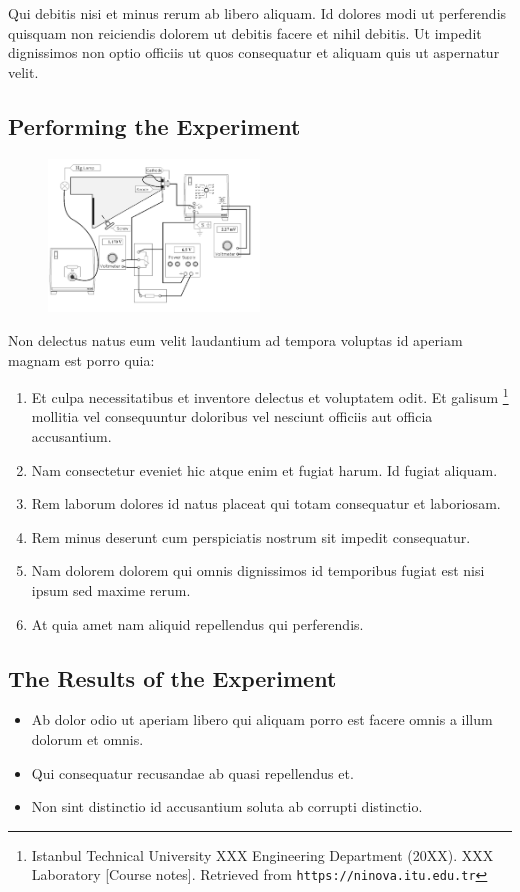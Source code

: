 \documentclass[10pt]{article}
\begin{document}
Qui debitis nisi et minus rerum ab libero aliquam. Id dolores modi ut perferendis quisquam non reiciendis dolorem ut debitis facere et nihil debitis. Ut impedit dignissimos non optio officiis ut quos consequatur et aliquam quis ut aspernatur velit. 

\subsection*{Performing the Experiment}
\begin{figure} %
    \raggedleft
    \vspace{0.5cm}
    \includegraphics[width=0.5\textwidth]{experimental_setup.png}
    \vspace{-2cm}
\end{figure}

Non delectus natus eum velit laudantium ad tempora voluptas id aperiam magnam est porro quia: 

\begin{enumerate}
\item Et culpa necessitatibus et inventore delectus et voluptatem odit. Et galisum \footnote{Istanbul Technical University XXX Engineering Department (20XX). XXX Laboratory [Course notes]. Retrieved from \texttt{https://ninova.itu.edu.tr}} mollitia vel consequuntur doloribus vel nesciunt officiis aut officia accusantium.

\item Nam consectetur eveniet hic atque enim et fugiat harum. Id fugiat aliquam.
\item Rem laborum dolores id natus placeat qui totam consequatur et laboriosam.
\item Rem minus deserunt cum perspiciatis nostrum sit impedit consequatur.
\item Nam dolorem dolorem qui omnis dignissimos id temporibus fugiat est nisi ipsum sed maxime rerum.
\item At quia amet nam aliquid repellendus qui perferendis.
\end{enumerate}
\subsection*{The Results of the Experiment }
\begin{itemize}
\item Ab dolor odio ut aperiam libero qui aliquam porro est facere omnis a illum dolorum et omnis. 
\item Qui consequatur recusandae ab quasi repellendus et.
\item Non sint distinctio id accusantium soluta ab corrupti distinctio.
\end{itemize}
\end{document}
